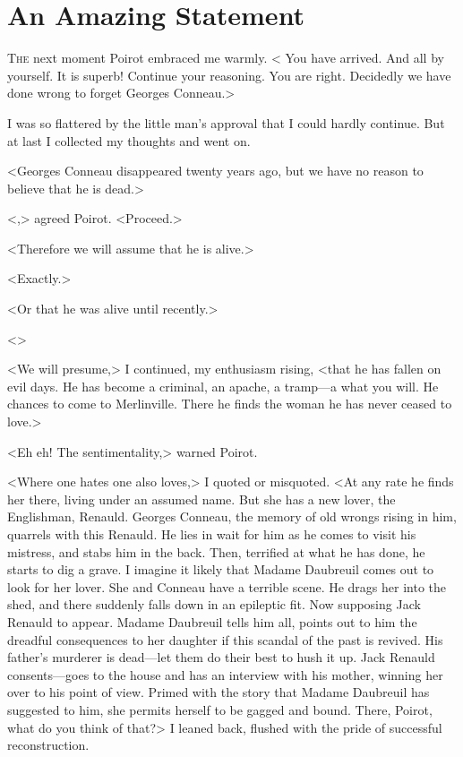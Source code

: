 \chapter{An Amazing Statement}

\lettrine{T}{he} next moment Poirot embraced me warmly. < You have arrived. And all by yourself. It is superb! Continue your reasoning. You are right. Decidedly we have done wrong to forget Georges Conneau.> 

 I was so flattered by the little man's approval that I could hardly continue. But at last I collected my thoughts and went on. 

 <Georges Conneau disappeared twenty years ago, but we have no reason to believe that he is dead.> 

 <,> agreed Poirot. <Proceed.> 

 <Therefore we will assume that he is alive.> 

 <Exactly.> 

 <Or that he was alive until recently.> 

 <> 

 <We will presume,> I continued, my enthusiasm rising, <that he has fallen on evil days. He has become a criminal, an apache, a tramp—a what you will. He chances to come to Merlinville. There he finds the woman he has never ceased to love.> 

 <Eh eh! The sentimentality,> warned Poirot. 

 <Where one hates one also loves,> I quoted or misquoted. <At any rate he finds her there, living under an assumed name. But she has a new lover, the Englishman, Renauld. Georges Conneau, the memory of old wrongs rising in him, quarrels with this Renauld. He lies in wait for him as he comes to visit his mistress, and stabs him in the back. Then, terrified at what he has done, he starts to dig a grave. I imagine it likely that Madame Daubreuil comes out to look for her lover. She and Conneau have a terrible scene. He drags her into the shed, and there suddenly falls down in an epileptic fit. Now supposing Jack Renauld to appear. Madame Daubreuil tells him all, points out to him the dreadful consequences to her daughter if this scandal of the past is revived. His father's murderer is dead—let them do their best to hush it up. Jack Renauld consents—goes to the house and has an interview with his mother, winning her over to his point of view. Primed with the story that Madame Daubreuil has suggested to him, she permits herself to be gagged and bound. There, Poirot, what do you think of that?> I leaned back, flushed with the pride of successful reconstruction. 

